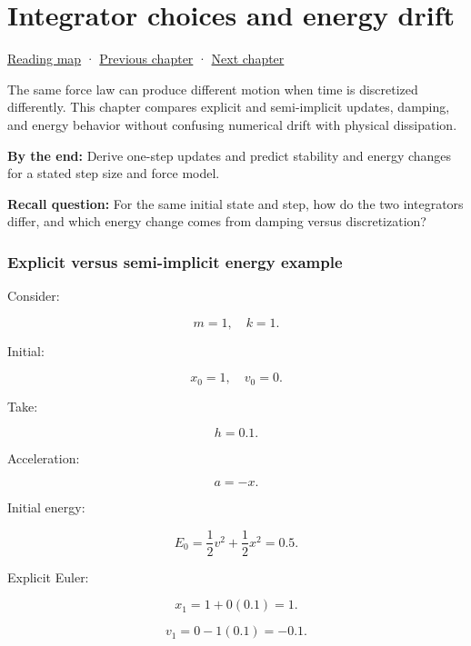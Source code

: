 \chapter{Integrator choices and energy drift}\label{06-engine-ii-ch038-integrator-choices-and-energy-drift}\hypertarget{06-engine-ii-ch038}{}\label{stagechapter:06-engine-ii-ch038}

\hypertarget{06-engine-ii-ch038-integrator-choices-and-energy-drift}{}

\hyperref[volume-reading-map]{Reading map} · \hyperref[06-engine-ii-ch037-physical-examples-and-state-validation]{Previous chapter} · \hyperref[06-engine-ii-ch039-composable-timesteps-and-stable-simulation-policy]{Next chapter}

The same force law can produce different motion when time is discretized differently. This chapter compares explicit and semi-implicit updates, damping, and energy behavior without confusing numerical drift with physical dissipation.

\textbf{By the end:} Derive one-step updates and predict stability and energy changes for a stated step size and force model.

\textbf{Recall question:} For the same initial state and step, how do the two integrators differ, and which energy change comes from damping versus discretization?

\subsection{Explicit versus semi-implicit energy example}\label{06-engine-ii-ch038-explicit-versus-semi-implicit-energy-example}

\hypertarget{06-engine-ii-ch038-explicit-versus-semi-implicit-energy-example}{}

Consider:

\[
m=1,\quad k=1.
\]

Initial:

\[
x_0=1,\quad v_0=0.
\]

Take:

\[
h=0.1.
\]

Acceleration:

\[
a=-x.
\]

Initial energy:

\[
E_0
=
\frac12v^2+
\frac12x^2
=
0.5.
\]

Explicit Euler:

\[
x_1=1+0(0.1)=1.
\]

\[
v_1=0-1(0.1)=-0.1.
\]

